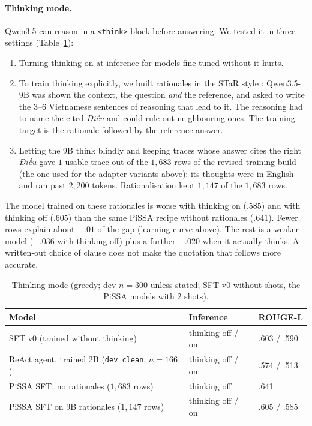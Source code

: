 \documentclass[11pt,a4paper]{article}
\newcommand{\rl}{ROUGE-L}
\newcommand{\dieu}{\textit{Điều}}
\begin{document}
\paragraph{Thinking mode.}
Qwen3.5 can reason in a \texttt{<think>} block before answering. We tested it in three settings (Table~\ref{tab:think}):
\begin{enumerate}[leftmargin=*]
\item Turning thinking on at inference for models fine-tuned without it hurts.
\item To train thinking explicitly, we built rationales in the STaR style \cite{star}: Qwen3.5-9B was shown the context, the question \emph{and} the reference, and asked to write the 3--6 Vietnamese sentences of reasoning that lead to it. The reasoning had to name the cited \dieu{} and could rule out neighbouring ones. The training target is the rationale followed by the reference answer.
\item Letting the 9B think blindly and keeping traces whose answer cites the right \dieu{} gave $1$ usable trace out of the $1{,}683$ rows of the revised training build (the one used for the adapter variants above): its thoughts were in English and ran past $2{,}200$ tokens. Rationalisation kept $1{,}147$ of the $1{,}683$ rows.
\end{enumerate}
The model trained on these rationales is worse with thinking on ($.585$) and with thinking off ($.605$) than the same PiSSA recipe without rationales ($.641$). Fewer rows explain about $-.01$ of the gap (learning curve above). The rest is a weaker model ($-.036$ with thinking off) plus a further $-.020$ when it actually thinks. A written-out choice of clause does not make the quotation that follows more accurate.
\begin{table}[H]
\centering
\caption{Thinking mode (greedy; dev $n{=}300$ unless stated; SFT v0 without shots, the PiSSA models with 2 shots).}\label{tab:think}
\small
\begin{tabular}{@{}lll@{}}
\toprule
Model & Inference & \rl{}\\
\midrule
SFT v0 (trained without thinking) & thinking off / on & .603 / .590\\
ReAct agent, trained 2B (\texttt{dev\_clean}, $n{=}166$) & thinking off / on & .574 / .513\\
PiSSA SFT, no rationales ($1{,}683$ rows) & thinking off & .641\\
PiSSA SFT on 9B rationales ($1{,}147$ rows) & thinking off / on & .605 / .585\\
\bottomrule
\end{tabular}
\end{table}
\end{document}

